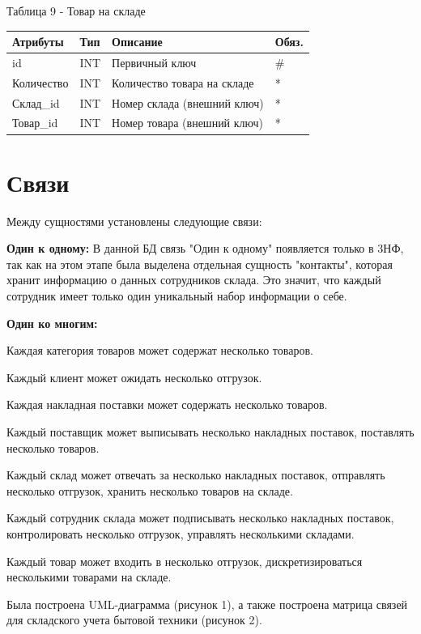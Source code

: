 \documentclass[14pt]{extreport}
\begin{document}
\noindent
Таблица 9 - Товар на складе

\begin{center}
\begin{longtable}{ |m{3.3cm}|m{3cm}|m{6cm}|m{1.8cm}| } 
 \hline
 Атрибуты & Тип & Описание & Обяз. \\ [0.5ex] 
 \hline\hline
 id & INT & Первичный ключ & \# \\
 \hline
 Количество & INT & Количество товара на складе & * \\
 \hline
 Склад\_id & INT & Номер склада (внешний ключ) & * \\
 \hline
 Товар\_id & INT & Номер товара (внешний ключ) & * \\
 \hline
\end{longtable}
\end{center}

\newpage

\section{Связи}
Между сущностями установлены следующие связи:


\textbf{Один к одному:}
В данной БД связь "Один к одному" появляется только в 3НФ, так как на этом этапе была выделена отдельная сущность "контакты", которая хранит информацию о данных сотрудников склада. Это значит, что каждый сотрудник имеет только один уникальный набор информации о себе.

\textbf{Один ко многим:} 


Каждая категория товаров может содержат несколько товаров.


Каждый клиент может ожидать несколько отгрузок.


Каждая накладная поставки может содержать несколько товаров.


Каждый поставщик может выписывать несколько накладных поставок, поставлять несколько товаров.


Каждый склад может отвечать за несколько накладных поставок, отправлять несколько отгрузок, хранить несколько товаров на складе.


Каждый сотрудник склада может подписывать несколько накладных поставок, контролировать несколько отгрузок, управлять несколькими складами.


Каждый товар может входить в несколько отгрузок, дискретизироваться несколькими товарами на складе.


\newpage

Была построена UML-диаграмма (рисунок 1), а также построена матрица связей для складского учета бытовой техники (рисунок 2).
\end{document}
